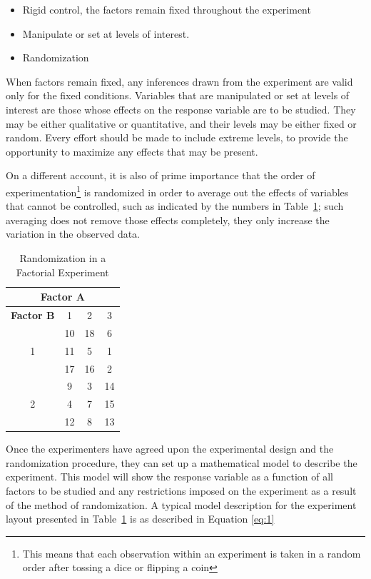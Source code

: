 \documentclass{WileySev}
\begin{document}
\begin{itemize}
\item
Rigid control, the factors remain fixed throughout the experiment
\item
Manipulate or set at levels of interest.
\item
Randomization
\end{itemize}

When factors remain fixed, any inferences drawn from the experiment are valid only for the fixed conditions. Variables that are manipulated or set at levels of interest are those whose effects on the response variable are to be studied. They may be either qualitative or quantitative, and their levels may be either fixed or random. Every effort should be made to include extreme levels, to provide the opportunity to maximize any effects that may be present. 

On a different account, it is also of prime importance that the order of experimentation\footnote{This means that each observation within an experiment is taken in a random order after tossing a dice or flipping a coin} is randomized in order to average out the effects of variables that cannot be controlled, such as indicated by the numbers in Table~\ref{tab:rando_factorial}; such averaging does not remove those effects completely, they only increase the variation in the observed data.

\begin{table}[h]
\caption{Randomization in a Factorial Experiment}
\centering
\begin{tabular}{ c|ccc }
\hline
\multicolumn{4}{c}{\textbf{Factor A}} \\
\hline
\textbf{Factor B} & 1 & 2 & 3 \\
\hline
\multirow{3}{6em}{1} & 10 & 18 & 6 \\
& 11 & 5 & 1 \\
& 17 & 16 & 2 \\
\hline
\multirow{3}{6em}{2} & 9 & 3 & 14 \\
& 4 & 7 & 15 \\
& 12 & 8 & 13 \\
\hline
\end{tabular}
\label{tab:rando_factorial}
\end{table}

Once the experimenters have agreed upon the experimental design and the randomization procedure, they can set up a mathematical model to describe the experiment. This model will show the response variable as a function of all factors to be studied and any restrictions imposed on the experiment as a result of the method of randomization. A typical model description for the experiment layout presented in Table~\ref{tab:rando_factorial} is as described in Equation \ref{eq:1}
\end{document}
